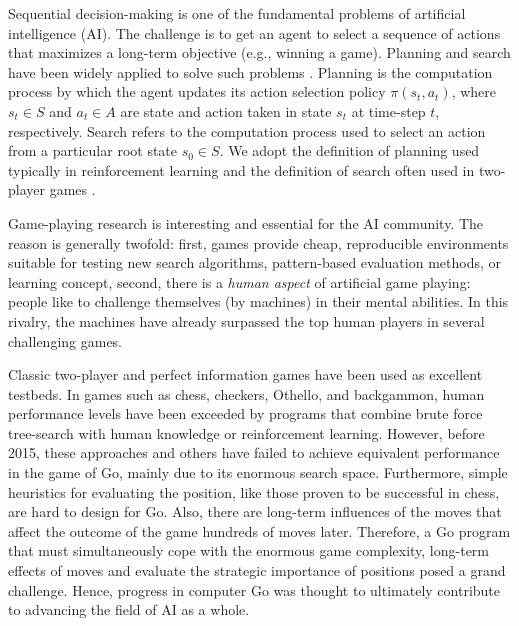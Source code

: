 Sequential decision-making is one of the fundamental problems of artificial intelligence (AI). The challenge is to get an agent to select a sequence of actions that maximizes a long-term objective (e.g., winning a game). Planning and search have been widely applied to solve such problems \cite{b1}. Planning is the computation process by which the agent updates its action selection policy $\pi(s_t, a_t)$, where $s_t \in S$ and $a_t \in A$ are state and action taken in state $s_t$ at time-step $t$, respectively. Search refers to the computation process used to select an action from a particular root state $s_0 \in S$. We adopt the definition of planning used typically in reinforcement learning \cite[pp.~1--11]{b2} and the definition of search often used in two-player games \cite[pp.~192--203]{b3}.

Game-playing research is interesting and essential for the AI community\cite{b4}. The reason is generally twofold: first, games provide cheap, reproducible environments suitable for testing new search algorithms, pattern-based evaluation methods, or learning concept, second, there is a \textit{human aspect} of artificial game playing: people like to challenge themselves (by machines) in their mental abilities. 
In this rivalry, the machines have already surpassed the top human players in several challenging games.

Classic two-player and perfect information games have been used as excellent testbeds. In games such as chess\cite{b5}, checkers\cite{b6}, Othello\cite{b7}, and backgammon\cite{b8}, human performance levels have been exceeded by programs that combine brute force tree-search\cite{b9} with human knowledge or reinforcement learning. However, before 2015, these approaches and others have failed to achieve equivalent performance in the game of Go, mainly due to its enormous search space. Furthermore, simple heuristics for evaluating the position, like those proven to be successful in chess, are hard to design for Go\cite{b10}. Also, there are long-term influences of the moves that affect the outcome of the game hundreds of moves later. Therefore, a Go program that must simultaneously cope with the enormous game complexity, long-term effects of moves and evaluate the strategic importance of positions posed a grand challenge. Hence, progress in computer Go was thought to ultimately contribute to advancing the field of AI as a whole\cite{b11}.

